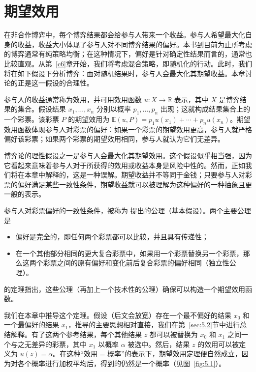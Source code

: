 \chapter{期望效用}  \label{c5}
在非合作博弈中，每个博弈结果都会给参与人带来一个收益。参与人希望最大化自身的收益，收益大小体现了参与人对不同博弈结果的偏好。本书到目前为止所考虑的博弈通常有纯策略均衡；在这种情况下，偏好是针对确定性结果而言的，通常也比较直观。从第~\ref{c6}章开始，我们将考虑混合策略，即随机化的行动。此时，我们将在如下假设下分析博弈：面对随机结果时，参与人会最大化其期望收益。本章讨论的正是这一假设的合理性。

参与人的收益通常称为效用，并可用效用函数 \(u : X \rightarrow  \mathbb{R}\) 表示，其中 \(X\) 是博弈结果的集合。假设结果 \({x}_{1},\ldots ,{x}_{n}\) 分别以概率 \({p}_{1},\ldots ,{p}_{n}\) 出现；这就构成结果集合上的一个彩票。该彩票 \(P\) 的期望效用为 \(\mathbb{E}\left( {u,P}\right)  = {p}_{1}u\left( {x}_{1}\right)  + \cdots  + {p}_{n}u\left( {x}_{n}\right)\)。期望效用函数体现参与人对彩票的偏好：如果一个彩票的期望效用更高，参与人就严格偏好该彩票；如果两个彩票的期望效用相同，参与人就认为它们无差异。

博弈论的理性假设之一是参与人会最大化其期望效用。这个假设似乎相当强，因为它看起来意味着参与人对于所获得的效用或收益本身是风险中性的。然而，正如我们将在本章中解释的，这是一种误解。期望收益并不等同于金钱；只要参与人对彩票的偏好满足某些一致性条件，期望收益就可以被理解为这种偏好的一种抽象且更一般的表示。

参与人对彩票偏好的一致性条件，被称为 \citet{vonneumann1947} 提出的公理（基本假设）。两个主要公理是
\begin{itemize}
\item 偏好是完全的，即任何两个彩票都可以比较，并且具有传递性；
\item 在一个其他部分相同的更大复合彩票中，如果用一个彩票替换另一个彩票，那么这两个彩票之间的原有偏好和变化前后复合彩票的偏好相同（独立性公理）。
\end{itemize}
\citet{vonneumann1947} 的定理指出，这些公理（再加上一个技术性的公理）确保可以构造一个期望效用函数。

我们在本章中推导这个定理。假设（后文会放宽）存在一个最不偏好的结果 \({x}_{0}\) 和一个最偏好的结果 \({x}_{1}\)，推导的主要思想相对直接，我们在第~\ref{sec:5.2}节中进行总结解释。有了这两个参考结果，每个其他结果 \(z\) 都可以被替换为 \({x}_{0}\) 和 \({x}_{1}\) 之间一个与之无差异的彩票，其中 \({x}_{1}\) 以概率 \(\alpha\) 被选中。然后，结果 \(z\) 的效用可以被定义为 \(u\left( z\right)  = \alpha\)。在这种“效用 = 概率”的表示下，期望效用定理便自然成立，因为对各个概率进行加权平均后，得到的仍然是一个概率（见图~\ref{fig:5.1}）。

